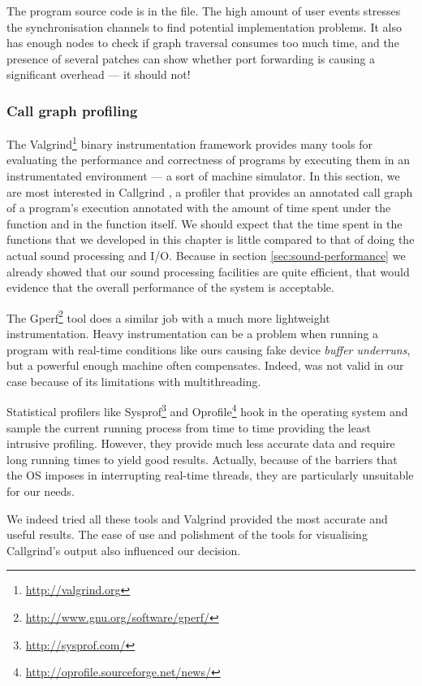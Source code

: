 The program source code is in the
 file. The high amount of user
events stresses the synchronisation channels to find potential
implementation problems. It also has enough nodes to check if graph
traversal consumes too much time, and the presence of several patches
can show whether port forwarding is causing a significant overhead ---
it should not!

\subsubsection{Call graph profiling}

The Valgrind\footnote{\url{http://valgrind.org}}
\cite{nethercote07valgrind} binary instrumentation framework provides
many tools for evaluating the performance and correctness of programs
by executing them in an instrumentated environment --- a sort of
machine simulator. In this section, we are most interested in
Callgrind \cite{weidendorfer04callgrind}, a profiler that provides an
annotated call graph of a program's execution annotated with the
amount of time spent under the function and in the function itself. We
should expect that the time spent in the functions that we developed
in this chapter is little compared to that of doing the actual sound
processing and I/O. Because in section \ref{sec:sound-performance} we
already showed that our sound processing facilities are quite
efficient, that would evidence that the overall performance of the
system is acceptable.

\begin{mynote}
  The Gperf\footnote{\url{http://www.gnu.org/software/gperf/}} tool
  does a similar job with a much more lightweight
  instrumentation. Heavy instrumentation can be a problem when running
  a program with real-time conditions like ours causing fake device
  \emph{buffer underruns}, but a powerful enough machine often
  compensates. Indeed,  was not valid in our case because
  of its limitations with multithreading. 

  Statistical profilers like
  Sysprof\footnote{\url{http://sysprof.com/}} and
  Oprofile\footnote{\url{http://oprofile.sourceforge.net/news/}} hook
  in the operating system and sample the current running process from
  time to time providing the least intrusive profiling. However, they
  provide much less accurate data and require long running times to
  yield good results. Actually, because of the barriers that the OS
  imposes in interrupting real-time threads, they are particularly
  unsuitable for our needs.

  We indeed tried all these tools and Valgrind provided the most
  accurate and useful results. The ease of use and polishment of the
  tools for visualising Callgrind's output also influenced our
  decision.
\end{mynote}

